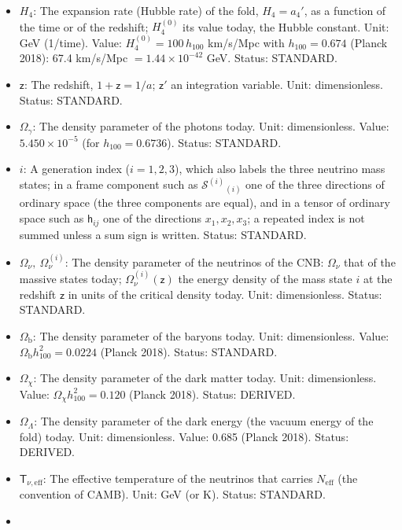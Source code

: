 \documentclass[
  10pt,
]{article}
\providecommand{\tightlist}{%
  \setlength{\itemsep}{0pt}\setlength{\parskip}{0pt}}
\begin{document}
\begin{itemize}
\tightlist
\item
  \(H_4\): The expansion rate (Hubble rate) of the fold, \(H_4 = a_4'\),
  as a function of the time or of the redshift; \(H_4^{(0)}\) its value
  today, the Hubble constant. Unit: GeV (1/time). Value:
  \(H_4^{(0)} = 100\,h_{100}\) km/s/Mpc with \(h_{100} = 0.674\) (Planck
  2018): 67.4 km/s/Mpc \(= 1.44\times10^{-42}\) GeV. Status: STANDARD.
\item
  \(\mathsf{z}\): The redshift, \(1 + \mathsf{z} = 1/a\);
  \(\mathsf{z}'\) an integration variable. Unit: dimensionless. Status:
  STANDARD.
\item
  \(\Omega_\gamma\): The density parameter of the photons today. Unit:
  dimensionless. Value: \(5.450\times10^{-5}\) (for
  \(h_{100} = 0.6736\)). Status: STANDARD.
\item
  \(i\): A generation index (\(i = 1, 2, 3\)), which also labels the
  three neutrino mass states; in a frame component such as
  \(\mathcal{S}^{(i)}{}_{(i)}\) one of the three directions of ordinary
  space (the three components are equal), and in a tensor of ordinary
  space such as \(\mathsf{h}_{ij}\) one of the directions
  \(x_1, x_2, x_3\); a repeated index is not summed unless a sum sign is
  written. Status: STANDARD.
\item
  \(\Omega_\nu,\ \Omega_\nu^{(i)}\): The density parameter of the
  neutrinos of the CNB: \(\Omega_\nu\) that of the massive states today;
  \(\Omega_\nu^{(i)}(\mathsf{z})\) the energy density of the mass state
  \(i\) at the redshift \(\mathsf{z}\) in units of the critical density
  today. Unit: dimensionless. Status: STANDARD.
\item
  \(\Omega_{\mathrm{b}}\): The density parameter of the baryons today.
  Unit: dimensionless. Value: \(\Omega_{\mathrm{b}}h_{100}^2 = 0.0224\)
  (Planck 2018). Status: STANDARD.
\item
  \(\Omega_\chi\): The density parameter of the dark matter today. Unit:
  dimensionless. Value: \(\Omega_\chi h_{100}^2 = 0.120\) (Planck 2018).
  Status: DERIVED.
\item
  \(\Omega_\Lambda\): The density parameter of the dark energy (the
  vacuum energy of the fold) today. Unit: dimensionless. Value: 0.685
  (Planck 2018). Status: DERIVED.
\item
  \(\mathsf{T}_{\nu,\mathrm{eff}}\): The effective temperature of the
  neutrinos that carries \(N_{\mathrm{eff}}\) (the convention of CAMB).
  Unit: GeV (or K). Status: STANDARD.
\item

\end{itemize}
\end{document}
